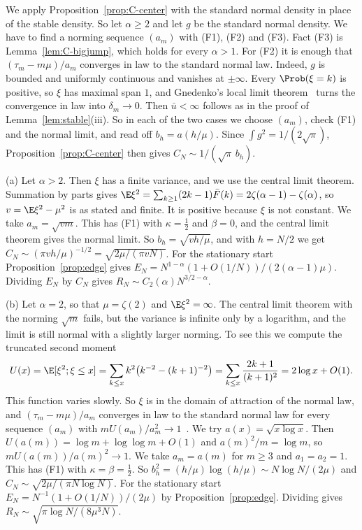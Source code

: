 We apply Proposition~\ref{prop:C-center} with the standard normal density in place of the
stable density. So let $\alpha\ge2$ and let $g$ be the standard normal density. We have
to find a norming sequence $(a_m)$ with (F1), (F2) and (F3). Fact (F3) is
Lemma~\ref{lem:C-bigjump}, which holds for every $\alpha>1$. For (F2) it is enough that
$(\tau_m-m\mu)/a_m$ converges in law to the standard normal law. Indeed, $g$ is bounded
and uniformly continuous and vanishes at $\pm\infty$. Every $\Prob(\xi=k)$ is positive,
so $\xi$ has maximal span $1$, and Gnedenko's local limit
theorem~\cite[Theorem~4.2.1]{ibragimovlinnik1971} turns the convergence in law into
$\delta_m\to0$. Then $\bar u<\infty$ follows as in the proof of
Lemma~\ref{lem:stable}(iii). So in each of the two cases we choose $(a_m)$, check (F1)
and the normal limit, and read off $b_h=a(h/\mu)$. Since $\int g^2=1/(2\sqrt\pi)$,
Proposition~\ref{prop:C-center} then gives $C_N\sim1/(\sqrt\pi\,b_h)$.

(a) Let $\alpha>2$. Then $\xi$ has a finite variance, and we use the central limit
theorem. Summation by parts gives
$\E\xi^2=\sum_{k\ge1}(2k-1)\bar F(k)=2\zeta(\alpha-1)-\zeta(\alpha)$, so $v=\E\xi^2-\mu^2$
is as stated and finite. It is positive because $\xi$ is not constant. We take
$a_m=\sqrt{vm}$. This has (F1) with $\kappa=\frac12$ and $\beta=0$, and the central limit
theorem gives the normal limit. So $b_h=\sqrt{vh/\mu}$, and with $h=N/2$ we get
$C_N\sim(\pi vh/\mu)^{-1/2}=\sqrt{2\mu/(\pi vN)}$. For the stationary start
Proposition~\ref{prop:edge} gives $E_N=N^{1-\alpha}(1+O(1/N))/(2(\alpha-1)\mu)$.
Dividing $E_N$ by $C_N$ gives $R_N\sim C_2(\alpha)N^{3/2-\alpha}$.

(b) Let $\alpha=2$, so that $\mu=\zeta(2)$ and $\E\xi^2=\infty$. The central limit
theorem with the norming $\sqrt m$ fails, but the variance is infinite only by a
logarithm, and the limit is still normal with a slightly larger norming. To see this we
compute the truncated second moment
\[
U(x)=\E[\xi^2;\xi\le x]=\sum_{k\le x}k^2\bigl(k^{-2}-(k+1)^{-2}\bigr)
=\sum_{k\le x}\frac{2k+1}{(k+1)^2}=2\log x+O(1).
\]
This function varies slowly. So $\xi$ is in the domain of attraction of the normal law,
and $(\tau_m-m\mu)/a_m$ converges in law to the standard normal law for every sequence
$(a_m)$ with
$mU(a_m)/a_m^2\to1$~\cite[Section~XVII.5]{feller1971}. We try
$a(x)=\sqrt{x\log x}$. Then $U(a(m))=\log m+\log\log m+O(1)$ and $a(m)^2/m=\log m$, so
$mU(a(m))/a(m)^2\to1$. We take $a_m=a(m)$ for $m\ge3$ and $a_1=a_2=1$. This has (F1)
with $\kappa=\beta=\frac12$. So $b_h^2=(h/\mu)\log(h/\mu)\sim N\log N/(2\mu)$ and
$C_N\sim\sqrt{2\mu/(\pi N\log N)}$. For the stationary start
$E_N=N^{-1}(1+O(1/N))/(2\mu)$ by Proposition~\ref{prop:edge}. Dividing gives
$R_N\sim\sqrt{\pi\log N/(8\mu^3N)}$.

